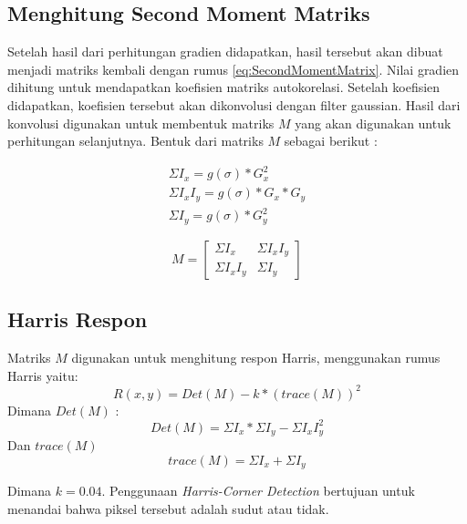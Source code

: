 \subsection{Menghitung Second Moment Matriks}
    Setelah hasil dari perhitungan gradien didapatkan, hasil tersebut akan dibuat menjadi matriks kembali dengan rumus \eqref{eq:SecondMomentMatrix}. Nilai gradien dihitung untuk mendapatkan koefisien matriks autokorelasi. Setelah koefisien didapatkan, koefisien tersebut akan dikonvolusi dengan filter gaussian.
Hasil dari konvolusi digunakan untuk membentuk matriks \(M\) yang akan digunakan untuk perhitungan selanjutnya. Bentuk dari matriks \(M\) sebagai berikut :

\begin{equation*}
    \begin{aligned}
        \Sigma I_{x} = g(\sigma) * G_{x}^2 \\
        \Sigma I_{x}I_{y} = g(\sigma) * G_{x} * G_{y} \\
        \Sigma I_{y} = g(\sigma) * G_{y}^2
    \end{aligned}
\end{equation*}

\begin{equation}
    M = 
    \begin{bmatrix}
        \Sigma I_{x} & \Sigma I_{x}I_{y} \\
        \Sigma I_{x}I_{y} & \Sigma I_{y}
    \end{bmatrix} 
\end{equation}

\subsection{Harris Respon}
    Matriks \(M\) digunakan untuk menghitung respon Harris, menggunakan rumus Harris yaitu:
\begin{equation}
    R(x,y) = Det(M) - k * (trace(M))^2
\end{equation}
Dimana \(Det(M)\) :
\begin{equation*}
    Det(M) = \Sigma I_{x} * \Sigma I_{y} - \Sigma I_{x}I_{y}^2
\end{equation*}
Dan \(trace(M)\) 
\begin{equation*}
    trace(M) = \Sigma I_{x} + \Sigma I_{y}
\end{equation*}

    Dimana \(k = 0.04\). Penggunaan \emph{Harris-Corner Detection} bertujuan untuk menandai bahwa piksel tersebut adalah sudut atau tidak.

